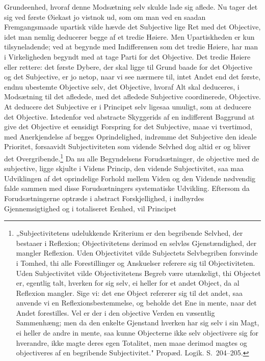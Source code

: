 \documentclass[12pt]{book}
\newcommand{\opage}[1]{\marginnote{\footnotesize\textit{[#1]}}}
\begin{document}
Grundeenhed, hvoraf denne Modsætning selv skulde lade sig aflede. Nu tager det sig
ved første Øiekast jo vistnok ud, som om man ved en saadan Fremgangsmaade upartisk
vilde hævde det Subjective lige Ret med det Objective, idet man nemlig deducerer begge
af et tredie Høiere. Men Upartiskheden er kun tilsyneladende; ved at begynde med
Indifferensen som det tredie Høiere, har man i Virkeligheden begyndt med at tage
Parti for det Objective. Det tredie Høiere eller rettere: det første Dybere, der skal
ligge til Grund baade for det Objective og det Subjective, er jo netop, naar vi see
nærmere til, intet Andet end det første, endnu ubestemte Objective selv, det
Objective, hvoraf Alt skal deduceres, i Modsætning til det afledede, med det afledede
Subjective coordinerede, Objective. At deducere det Subjective er i Principet selv
ligesaa umuligt, som at deducere det Objective. Istedenfor ved abstracte Skyggerids
af en indifferent Baggrund at give det Objective et eensidigt Forspring for det
Subjective, maae vi tvertimod, med Anerkjendelse af begges Oprindelighed, indrømme
det Subjective den ideale Prioritet, forsaavidt Subjectiviteten som vidende Selvhed
dog altid er og bliver det Overgribende.\footnote{„Subjectivitetens udelukkende
Kriterium er den begribende Selvhed, der bestaaer i Reflexion; Objectivitetens
derimod en selvløs Gjenstændighed, der mangler Reflexion. Uden Objectivitet vilde
Subjectets Selvbegriben forsvinde i Tomhed, thi alle Forestillinger og Anskuelser
referere sig til Objectiviteten. Uden Subjectivitet vilde Objectivitetens Begreb være
utænkeligt, thi Objectet er, egentlig talt, hverken for sig selv, ei heller for et
andet Object, da al Reflexion mangler. Sige vi: det ene Object refererer sig til det
andet, saa anvende vi en Reflexionsbestemmelse, og beholde det Ene in mente, naar det
Andet forestilles. Vel er der i den objective Verden en væsentlig Sammenhæng; men da
den enkelte Gjenstand hverken har sig selv i sin Magt, ei heller de andre in mente,
saa kunne Objecterne ikke selv objectivere sig for hverandre, ikke magte deres egen
Totalitet, men maae derimod magtes og objectiveres af en begribende Subjectivitet."
Propæd. Logik. S.~204--205.}
\opage{11} Da nu alle Begyndelsens Forudsætninger, de objective med de subjective, ligge skjulte
i Videns Princip, den vidende Subjectivitet, saa maa Udviklingen af det oprindelige
Forhold mellem Viden og den Vidende nødvendig falde sammen med disse Forudsætningers
systematiske Udvikling. Eftersom da Forudsætningerne optræde i abstract
Forskjellighed, i indbyrdes Gjennemsigtighed og i totaliseret Eenhed, vil Principet
\end{document}
